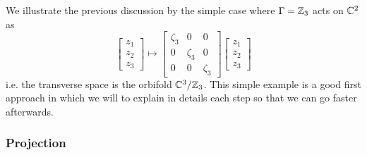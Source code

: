         We illustrate the previous discussion by the simple case where $\Gamma=\mathbb{Z}_3$ acts on $\mathbb{C}^2$ as
        \begin{equation}
            \begin{bmatrix}
                z_1\\z_2\\z_3
            \end{bmatrix}\mapsto
            \begin{bmatrix}
                \zeta_3 & 0 & 0 \\
                0 & \zeta_3 & 0 \\
                0 & 0 & \zeta_3
            \end{bmatrix}
            \begin{bmatrix}
                z_1\\z_2\\z_3
            \end{bmatrix}
        \end{equation}
        i.e. the transverse space is the orbifold $\mathbb{C}^3/\mathbb{Z}_3$. This simple example is a good first approach in which we will to explain in details each step so that we can go faster afterwards.

        \subsubsection{Projection}

